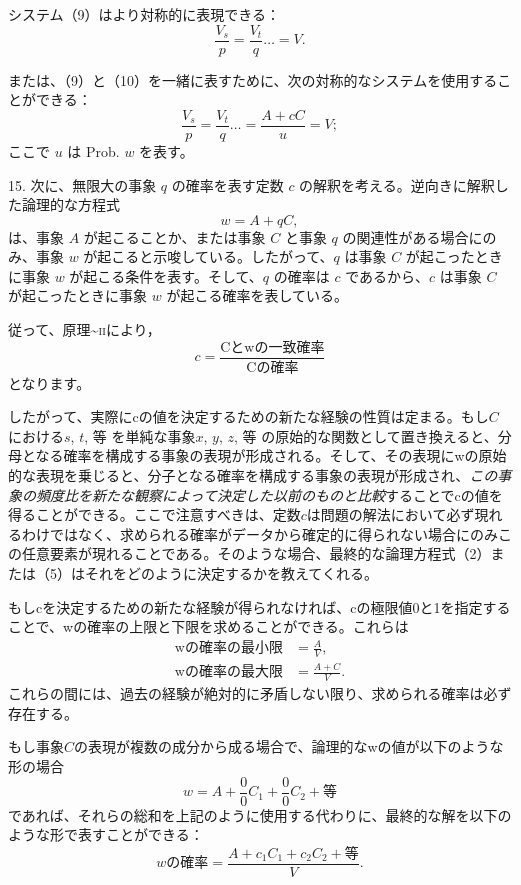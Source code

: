 \documentclass[a4paper,11pt,openany]{ltjsbook}
\begin{document}
システム（9）はより対称的に表現できる：
\[
  \frac{V_s}{p} = \frac{V_t}{q} \dotso = V. \tag{11}
\]

または、（9）と（10）を一緒に表すために、次の対称的なシステムを使用することができる：
\[
  \frac{V_s}{p} = \frac{V_t}{q} \dotso = \frac{A + cC}{u} = V; \tag{12}
\]
ここで $u$ は Prob. $w$ を表す。

15. 次に、無限大の事象 $q$ の確率を表す定数 $c$ の解釈を考える。逆向きに解釈した論理的な方程式
\[
  w = A + qC,
\]
は、事象 $A$ が起こることか、または事象 $C$ と事象 $q$ の関連性がある場合にのみ、事象 $w$ が起こると示唆している。したがって、$q$ は事象 $C$ が起こったときに事象 $w$ が起こる条件を表す。そして、$q$ の確率は $c$ であるから、$c$ は事象 $C$ が起こったときに事象 $w$ が起こる確率を表している。

従って、原理\textasciitilde{}\textsc{ii}により，
\[
  c = \frac{\text{Cとwの一致確率}}{\text{Cの確率}}
\]
となります。


したがって、実際にcの値を決定するための新たな経験の性質は定まる。もし$C$における$s$, $t$, 等 を単純な事象$x$, $y$, $z$, 等 の原始的な関数として置き換えると、分母となる確率を構成する事象の表現が形成される。そして、その表現にwの原始的な表現を乗じると、分子となる確率を構成する事象の表現が形成され、\emph{この事象の頻度比を新たな観察によって決定した以前のものと比較}することでcの値を得ることができる。ここで注意すべきは、定数$c$は問題の解法において必ず現れるわけではなく、求められる確率がデータから確定的に得られない場合にのみこの任意要素が現れることである。そのような場合、最終的な論理方程式（2）または（5）はそれをどのように決定するかを教えてくれる。

もしcを決定するための新たな経験が得られなければ、cの極限値0と1を指定することで、wの確率の上限と下限を求めることができる。これらは
\[
\begin{array}{cccccc}
  \text{wの確率の最小限} &= \frac{A}{V}, \\
  \text{wの確率の最大限} &= \frac{A+C}{V}.
\end{array}
\]
これらの間には、過去の経験が絶対的に矛盾しない限り、求められる確率は必ず存在する。

もし事象$C$の表現が複数の成分から成る場合で、論理的なwの値が以下のような形の場合
\[
  w = A + \frac{0}{0}C_1 + \frac{0}{0}C_2 + \text{等}
\]
であれば、それらの総和を上記のように使用する代わりに、最終的な解を以下のような形で表すことができる：
\[
  wの確率 = \frac{A + c_1C_1 + c_2C_2 + \text{等}}{V}.
\]
\end{document}
